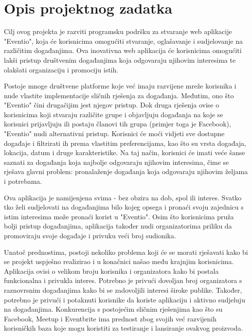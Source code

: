 \chapter{Opis projektnog zadatka}
		
		
		Cilj ovog projekta je razviti programsku podršku za stvaranje web aplikacije "Eventio", koja će korisnicima omogućiti stvaranje, oglašavanje i sudjelovanje na različitim događanjima. Ova inovativna web aplikacija će korisnicima omogućiti lakši pristup društvenim događanjima koja odgovaraju njihovim interesima te olakšati organizaciju i promociju istih.
		
		Postoje mnoge društvene platforme koje već imaju razvijene mreže korisnika i nude vlastite implementacije sličnih rješenja za događanja. Međutim, ono što "Eventio" čini drugačijim jest njegov pristup. Dok druga rješenja ovise o korisnicima koji stvaraju različite grupe i objavljuju događanja na koje se korisnici prijavljuju ili postaju članovi tih grupa (primjer toga je Facebook), "Eventio" nudi alternativni pristup. Korisnici će moći vidjeti sve dostupne događaje i filtrirati ih prema vlastitim preferencijama, kao što su vrsta događaja, lokacija, datum i druge karakteristike. Na taj način, korisnici će imati veće šanse saznati za događanja koja najbolje odgovaraju njihovim interesima, čime se rješava glavni problem: pronalaženje događanja koja odgovaraju njihovim željama i potrebama.
		
		Ova aplikacija je namijenjena svima - bez obzira na dob, spol ili interes. Svatko tko želi sudjelovati na događanjima bilo kojeg opsega i pronaći svoju zajednicu s istim interesima može pronaći korist u "Eventio". Osim što korisnicima pruža bolji pristup događanjima, aplikacija također nudi organizatorima priliku da promoviraju svoje događaje i privuku veći broj sudionika.
		
		Unatoč prednostima, postoji nekoliko problema koji će se morati rješavati kako bi se projekt uspješno realizirao i u konačnici našao među krajnjim korisnicima. Aplikacija ovisi o velikom broju korisnika i organizatora kako bi postala funkcionalna i privukla interes. Potrebno je privući dovoljan broj organizatora s raznovrsnim događanjima kako bi se zadovoljili interesi široke publike. Također, potrebno je privući i potaknuti korisnike da koriste aplikaciju i aktivno sudjeluju na događanjima. Konkurencija s postojećim sličnim rješenjima kao što su Facebook, Meetup i Eventbrite ima prednost zbog svojih već razvijenih korisničkih baza koje mogu koristiti za testiranje i lansiranje ovakvog proizvoda.
		
